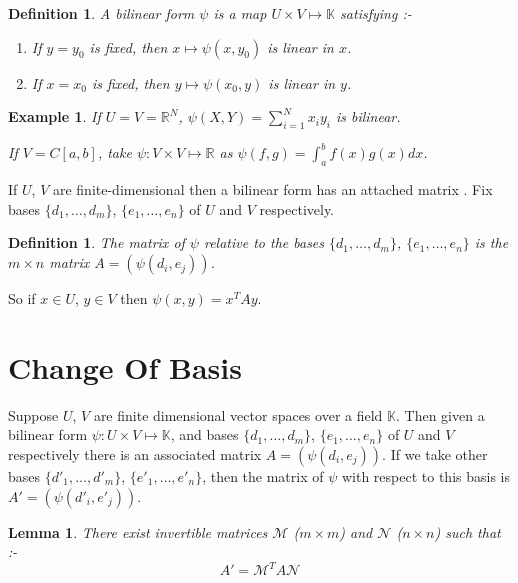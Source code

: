 \documentclass{notes}
\theoremstyle{plain}
\newtheorem{definition}[theorem]{Definition}
\newtheorem{lemma}[theorem]{Lemma}
\newtheorem*{example}{Example}
\begin{document}
\begin{definition}
  A bilinear form $\psi$ is a map $U \times V \mapsto \mathbb{K}$
  satisfying :-
\begin{enumerate}
\item If $y = y_0$ is fixed, then $x \mapsto \psi (x,y_0)$ is linear
  in $x$.
\item If $x = x_0$ is fixed, then $y \mapsto \psi (x_0,y)$ is linear
  in $y$.
\end{enumerate}
\end{definition}

\begin{example}
  If $U=V=\mathbb{R}^{N}$, $\psi (X,Y) = \sum_{i=1}^{N}x_{i}y_{i}$ is
  bilinear.
  
  If $V=C[a,b]$, take $\psi : V \times V \mapsto \mathbb{R}$ as $\psi
  (f,g) = \int_a^{b}f(x)g(x)dx$.
\end{example}

If $U$, $V$ are finite-dimensional then a bilinear form has an
attached matrix .  Fix bases $\{d_1, \dots ,d_m\}$, $\{e_1, \dots ,
e_n\}$ of $U$ and $V$ respectively.

\begin{definition}
  The matrix of $\psi$ relative to the bases $\{d_1, \dots
  ,d_m\}$, $\{e_1, \dots , e_n\}$ is the $m \times n$ matrix $A =
  (\psi (d_i,e_j))$.
\end{definition}

So if $x \in U$, $y \in V$ then $\psi (x,y) = x^{T}Ay$.

\section{Change Of Basis}

Suppose $U$, $V$ are finite dimensional vector spaces over a field
$\mathbb{K}$.  Then given a bilinear form $\psi : U \times V \mapsto
\mathbb{K}$, and bases $\{d_1, \dots ,d_m\}$, $\{e_1, \dots , e_n\}$
of $U$ and $V$ respectively there is an associated matrix $A =
\left(\psi (d_i,e_j)\right)$.  If we take other bases $\{d'_1, \dots
,d'_m\}$, $\{e'_1, \dots , e'_n\}$, then the matrix of $\psi$ with
respect to this basis is $A' = \left(\psi(d'_i,e'_j)\right)$.

\begin{lemma}
  There exist invertible matrices $\mathcal{M}$ ($m \times m$) and
  $\mathcal{N}$ ($n \times n$) such that :-
\[
A' = \mathcal{M}^{T}A\mathcal{N}
\] 
\end{lemma}
\end{document}
